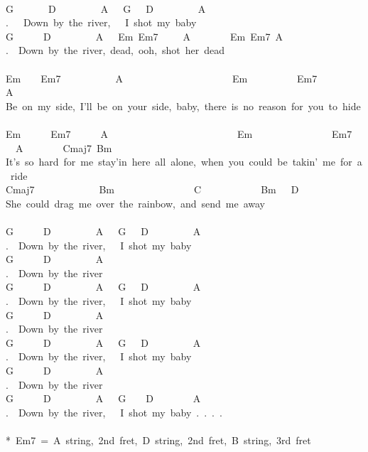{\\
G\ \ \ \ \ \ \ D\ \ \ \ \ \ \ \ \ A\ \ \ G\ \ \ D\ \ \ \ \ \ \ \ \ A\\
.\ \ \ Down\ by\ the\ river,\ \ \ I\ shot\ my\ baby\\
G\ \ \ \ \ \ D\ \ \ \ \ \ \ \ \ A\ \ \ Em\ Em7\ \ \ \ \ A\ \ \ \ \ \ \ \ Em\ Em7\ A\\
.\ \ Down\ by\ the\ river,\ dead,\ ooh,\ shot\ her\ dead\\
\\
Em\ \ \ \ Em7\ \ \ \ \ \ \ \ \ \ \ A\ \ \ \ \ \ \ \ \ \ \ \ \ \ \ \ \ \ \ \ \ \ Em\ \ \ \ \ \ \ \ \ \ Em7\ \ \ \ \ \ \ \ A\\
Be\ on\ my\ side,\ I'll\ be\ on\ your\ side,\ baby,\ there\ is\ no\ reason\ for\ you\ to\ hide\ \ \ \ \\
Em\ \ \ \ \ \ Em7\ \ \ \ \ \ A\ \ \ \ \ \ \ \ \ \ \ \ \ \ \ \ \ \ \ \ \ \ \ \ \ \ Em\ \ \ \ \ \ \ \ \ \ \ \ \ \ \ \ Em7\ \ \ \ A\ \ \ \ \ \ \ \ Cmaj7\ Bm\\
It's\ so\ hard\ for\ me\ stay'in\ here\ all\ alone,\ when\ you\ could\ be\ takin'\ me\ for\ a\ ride\ \\
Cmaj7\ \ \ \ \ \ \ \ \ \ \ \ \ Bm\ \ \ \ \ \ \ \ \ \ \ \ \ \ \ \ C\ \ \ \ \ \ \ \ \ \ \ \ Bm\ \ \ D\\
She\ could\ drag\ me\ over\ the\ rainbow,\ and\ send\ me\ away\ \\
\\
G\ \ \ \ \ \ D\ \ \ \ \ \ \ \ \ A\ \ \ G\ \ \ D\ \ \ \ \ \ \ \ \ A\\
.\ \ Down\ by\ the\ river,\ \ \ I\ shot\ my\ baby\\
G\ \ \ \ \ \ D\ \ \ \ \ \ \ \ \ A\ \ \ \ \ \ \\
.\ \ Down\ by\ the\ river\ \\
G\ \ \ \ \ \ D\ \ \ \ \ \ \ \ \ A\ \ \ G\ \ \ D\ \ \ \ \ \ \ \ \ A\\
.\ \ Down\ by\ the\ river,\ \ \ I\ shot\ my\ baby\\
G\ \ \ \ \ \ D\ \ \ \ \ \ \ \ \ A\ \ \ \ \ \ \\
.\ \ Down\ by\ the\ river\ \\
G\ \ \ \ \ \ D\ \ \ \ \ \ \ \ \ A\ \ \ G\ \ \ D\ \ \ \ \ \ \ \ \ A\\
.\ \ Down\ by\ the\ river,\ \ \ I\ shot\ my\ baby\\
G\ \ \ \ \ \ D\ \ \ \ \ \ \ \ \ A\ \ \ \ \ \ \\
.\ \ Down\ by\ the\ river\ \\
G\ \ \ \ \ \ D\ \ \ \ \ \ \ \ \ A\ \ \ G\ \ \ \ D\ \ \ \ \ \ \ \ A\\
.\ \ Down\ by\ the\ river,\ \ \ I\ shot\ my\ baby\ .\ .\ .\ .\\
\\
*\ Em7\ =\ A\ string,\ 2nd\ fret,\ D\ string,\ 2nd\ fret,\ B\ string,\ 3rd\
fret\\}

